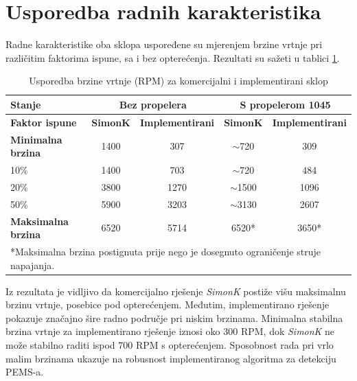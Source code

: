 \documentclass[diplomskirad]{fer}
\begin{document}
\section{Usporedba radnih karakteristika}
\label{sec:usporedba_karakteristika}

Radne karakteristike oba sklopa uspoređene su mjerenjem brzine vrtnje pri
različitim faktorima ispune, sa i bez opterećenja. Rezultati su sažeti u
tablici \ref{tab:usporedba_brzina}.

\begin{table}[h!]
	\centering
	\caption{Usporedba brzine vrtnje (RPM) za komercijalni i implementirani sklop}
	\label{tab:usporedba_brzina}
	\begin{tabular}{|l|c|c|c|c|}
		\hline
		\textbf{Stanje}            & \multicolumn{2}{c|}{\textbf{Bez propelera}} & \multicolumn{2}{c|}{\textbf{S propelerom 1045}}                                              \\ \hline
		\textbf{Faktor ispune}     & \textbf{SimonK}                             & \textbf{Implementirani}                         & \textbf{SimonK}  & \textbf{Implementirani} \\ \hline
		\textbf{Minimalna brzina}  & \num{1400}                                  & \num{307}                                       & $\sim$\num{720}  & \num{309}               \\ \hline
		10\%                       & \num{1400}                                  & \num{703}                                       & $\sim$\num{720}  & \num{484}               \\ \hline
		20\%                       & \num{3800}                                  & \num{1270}                                      & $\sim$\num{1500} & \num{1096}              \\ \hline
		50\%                       & \num{5900}                                  & \num{3203}                                      & $\sim$\num{3130} & \num{2607}              \\ \hline
		\textbf{Maksimalna brzina} & \num{6520}                                  & \num{5714}                                      & \num{6520}*      & \num{3650}*             \\ \hline
		\multicolumn{5}{l}{\footnotesize{*Maksimalna brzina postignuta prije nego je dosegnuto ograničenje struje napajanja.}}
	\end{tabular}
\end{table}

Iz rezultata je vidljivo da komercijalno rješenje \textit{SimonK} postiže višu
maksimalnu brzinu vrtnje, posebice pod opterećenjem. Međutim, implementirano
rješenje pokazuje značajno šire radno područje pri niskim brzinama. Minimalna
stabilna brzina vrtnje za implementirano rješenje iznosi oko 300 RPM, dok
\textit{SimonK} ne može stabilno raditi ispod 700 RPM s opterećenjem.
Sposobnost rada pri vrlo malim brzinama ukazuje na robusnost implementiranog
algoritma za detekciju PEMS-a.
\end{document}

